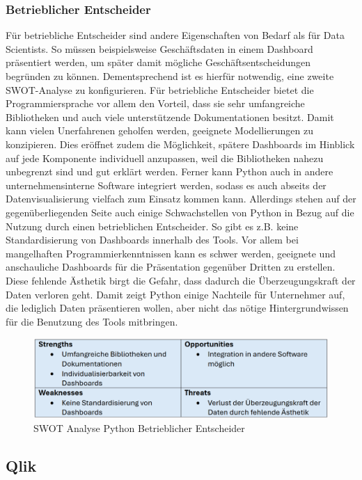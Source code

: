 \documentclass[12pt]{article}
\begin{document}
	\subsubsection{Betrieblicher Entscheider}
	
	Für betriebliche Entscheider sind andere Eigenschaften von Bedarf als für Data Scientists. So müssen beispielsweise Geschäftsdaten in einem
	Dashboard präsentiert werden, um später damit mögliche Geschäftsentscheidungen
	begründen zu können. Dementsprechend ist es hierfür notwendig, eine zweite SWOT-Analyse zu konfigurieren.
	Für betriebliche Entscheider bietet die Programmiersprache vor allem den Vorteil, dass sie sehr
	umfangreiche Bibliotheken und auch viele unterstützende Dokumentationen besitzt.
	Damit kann vielen Unerfahrenen geholfen werden, geeignete Modellierungen zu
	konzipieren. Dies eröffnet zudem die Möglichkeit, spätere Dashboards im Hinblick auf
	jede Komponente individuell anzupassen, weil die Bibliotheken nahezu unbegrenzt sind
	und gut erklärt werden.
	Ferner kann Python auch in andere unternehmensinterne Software integriert werden,
	sodass es auch abseits der Datenvisualisierung vielfach zum Einsatz kommen kann.
	Allerdings stehen auf der gegenüberliegenden Seite auch einige Schwachstellen von
	Python in Bezug auf die Nutzung durch einen betrieblichen Entscheider.
	So gibt es z.B. keine Standardisierung von Dashboards innerhalb des Tools. Vor
	allem bei mangelhaften Programmierkenntnissen kann es schwer
	werden, geeignete und anschauliche Dashboards für die Präsentation gegenüber Dritten
	zu erstellen. Diese fehlende Ästhetik birgt die Gefahr, dass dadurch die
	Überzeugungskraft der Daten verloren geht.
	Damit zeigt Python einige Nachteile für Unternehmer auf, die lediglich Daten
	präsentieren wollen, aber nicht das nötige Hintergrundwissen für die Benutzung des
	Tools mitbringen.
	\begin{figure}[h]
		\centering
		\includegraphics[width=1.0\textwidth]{SWOT2}
		\caption{SWOT Analyse Python Betrieblicher Entscheider}
	\end{figure}
	
	\subsection{Qlik}
	
\end{document}
